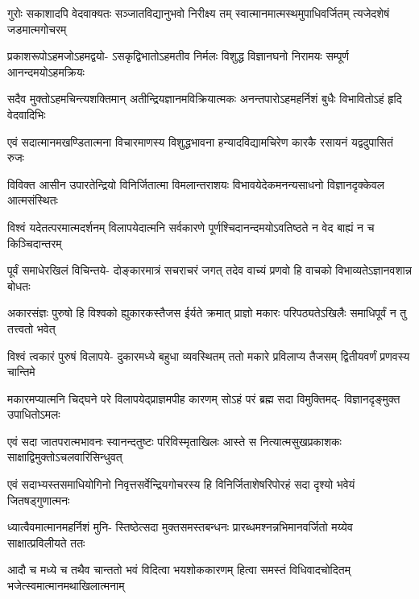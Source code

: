 \fourlineindentedshloka
{गुरोः सकाशादपि वेदवाक्यतः}
{सञ्जातविद्यानुभवो निरीक्ष्य तम्}
{स्वात्मानमात्मस्थमुपाधिवर्जितम्}
{त्यजेदशेषं जडमात्मगोचरम्} %

\fourlineindentedshloka
{प्रकाशरूपोऽहमजोऽहमद्वयो-}
{ऽसकृद्विभातोऽहमतीव निर्मलः}
{विशुद्ध विज्ञानघनो निरामयः}
{सम्पूर्ण आनन्दमयोऽहमक्रियः} %

\fourlineindentedshloka
{सदैव मुक्तोऽहमचिन्त्यशक्तिमान्}
{अतीन्द्रियज्ञानमविक्रियात्मकः}
{अनन्तपारोऽहमहर्निशं बुधैः}
{विभावितोऽहं हृदि वेदवादिभिः} %

\fourlineindentedshloka
{एवं सदात्मानमखण्डितात्मना}
{विचारमाणस्य विशुद्धभावना}
{हन्यादविद्यामचिरेण कारकै}
{रसायनं यद्वदुपासितं रुजः} %

\fourlineindentedshloka
{विविक्त आसीन उपारतेन्द्रियो}
{विनिर्जितात्मा विमलान्तराशयः}
{विभावयेदेकमनन्यसाधनो}
{विज्ञानदृक्केवल आत्मसंस्थितः} %

\fourlineindentedshloka
{विश्वं यदेतत्परमात्मदर्शनम्}
{विलापयेदात्मनि सर्वकारणे}
{पूर्णश्चिदानन्दमयोऽवतिष्ठते}
{न वेद बाह्यं न च किञ्चिदान्तरम्} %

\fourlineindentedshloka
{पूर्वं समाधेरखिलं विचिन्तये-}
{दोङ्कारमात्रं सचराचरं जगत्}
{तदेव वाच्यं प्रणवो हि वाचको}
{विभाव्यतेऽज्ञानवशान्न बोधतः} %

\fourlineindentedshloka
{अकारसंज्ञः पुरुषो हि विश्वको}
{ह्युकारकस्तैजस ईर्यते क्रमात्}
{प्राज्ञो मकारः परिपठ्यतेऽखिलैः}
{समाधिपूर्वं न तु तत्त्वतो भवेत्} %

\fourlineindentedshloka
{विश्वं त्वकारं पुरुषं विलापये-}
{दुकारमध्ये बहुधा व्यवस्थितम्}
{ततो मकारे प्रविलाप्य तैजसम्}
{द्वितीयवर्णं प्रणवस्य चान्तिमे} %

\fourlineindentedshloka
{मकारमप्यात्मनि चिद्घने परे}
{विलापयेद्प्राज्ञमपीह कारणम्}
{सोऽहं परं ब्रह्म सदा विमुक्तिमद्-}
{विज्ञानदृङ्मुक्त उपाधितोऽमलः} %

\fourlineindentedshloka
{एवं सदा जातपरात्मभावनः}
{स्वानन्दतुष्टः परिविस्मृताखिलः}
{आस्ते स नित्यात्मसुखप्रकाशकः}
{साक्षाद्विमुक्तोऽचलवारिसिन्धुवत्} %

\fourlineindentedshloka
{एवं सदाभ्यस्तसमाधियोगिनो}
{निवृत्तसर्वेन्द्रियगोचरस्य हि}
{विनिर्जिताशेषरिपोरहं सदा}
{दृश्यो भवेयं जितषड्गुणात्मनः} %

\fourlineindentedshloka
{ध्यात्वैवमात्मानमहर्निशं मुनि-}
{स्तिष्ठेत्सदा मुक्तसमस्तबन्धनः}
{प्रारब्धमश्नन्नभिमानवर्जितो}
{मय्येव साक्षात्प्रविलीयते ततः} %

\fourlineindentedshloka
{आदौ च मध्ये च तथैव चान्ततो}
{भवं विदित्वा भयशोककारणम्}
{हित्वा समस्तं विधिवादचोदितम्}
{भजेत्स्वमात्मानमथाखिलात्मनाम्} %

